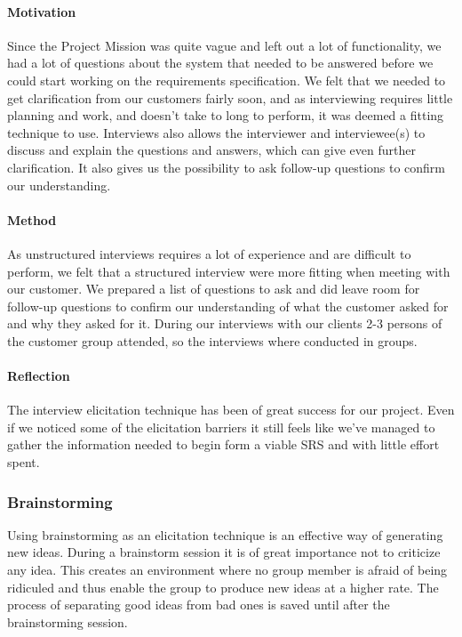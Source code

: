 \documentclass[10pt]{article}
\begin{document}
\paragraph{Motivation}
\hfill \break
Since the Project Mission was quite vague and left out a lot of functionality, we had a lot of questions about the system that needed to be answered before we could start working on the requirements specification. We felt that we needed to get clarification from our customers fairly soon, and as interviewing requires little planning and work, and doesn’t take to long to perform, it was deemed a fitting technique to use. Interviews also allows the interviewer and interviewee(s) to discuss and explain the questions and answers, which can give even further clarification. It also gives us the possibility to ask follow-up questions to confirm our understanding.

\paragraph{Method}
\hfill \break
As unstructured interviews requires a lot of experience and are difficult to perform, we felt that a structured interview were more fitting when meeting with our customer. We prepared a list of questions to ask and did leave room for follow-up questions to confirm our understanding of what the customer asked for and why they asked for it. During our interviews with our clients 2-3 persons of the customer group attended, so the interviews where conducted in groups.

\paragraph{Reflection}
\hfill \break
The interview elicitation technique has been of great success for our project. Even if we noticed some of the elicitation barriers it still feels like we've managed to gather the information needed to begin form a viable SRS and with little effort spent.

\subsubsection{Brainstorming}
Using brainstorming as an elicitation technique is an effective way of generating new ideas. During a brainstorm session it is of great importance not to criticize any idea. This creates an environment where no group member is afraid of being ridiculed and thus enable the group to produce new ideas at a higher rate.
The process of separating good ideas from bad ones is saved until after the brainstorming session.
\end{document}
